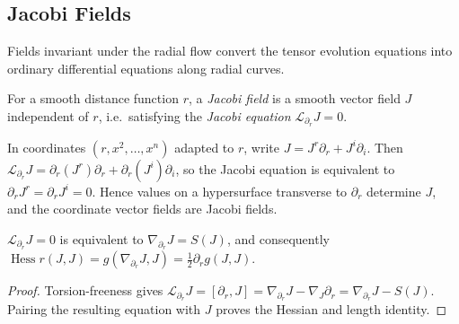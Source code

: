 \subsection{Jacobi Fields}

Fields invariant under the radial flow convert the tensor evolution equations
into ordinary differential equations along radial curves.

\begin{definition}
  \label{def:pet-ch3-jacobi-field}
  \leanok
  For a smooth distance function $r$, a \emph{Jacobi field} is a smooth vector
  field $J$ independent of $r$, i.e.\ satisfying the \emph{Jacobi equation}
  $\mathcal L_{\partial_r}J=0$.
\end{definition}

\begin{remark}
  \label{rem:pet-ch3-jacobi-field-construction}
  \leanok
  \sketch
  In coordinates $(r,x^2,\dots,x^n)$ adapted to $r$, write
  $J=J^r\partial_r+J^i\partial_i$. Then
  $\mathcal L_{\partial_r}J=\partial_r(J^r)\partial_r+\partial_r(J^i)\partial_i$, so the Jacobi
  equation is equivalent to $\partial_rJ^r=\partial_rJ^i=0$. Hence values on a
  hypersurface transverse to $\partial_r$ determine $J$, and the coordinate
  vector fields are Jacobi fields.
\end{remark}

\begin{lemma}
  \label{lem:pet-ch3-jacobi-field-equivalent-equation}
  \leanok
  $\mathcal L_{\partial_r}J=0$ is equivalent to $\nabla_{\partial_r}J=S(J)$, and
  consequently $\operatorname{Hess}r(J,J)=g(\nabla_{\partial_r}J,J)=\tfrac12\partial_rg(J,J)$.
\end{lemma}
\begin{proof}
  \leanok
  \sketch
  Torsion-freeness gives
  $\mathcal L_{\partial_r}J=[\partial_r,J]
  =\nabla_{\partial_r}J-\nabla_J\partial_r
  =\nabla_{\partial_r}J-S(J)$.
  Pairing the resulting equation with $J$ proves the Hessian and length identity.
\end{proof}

